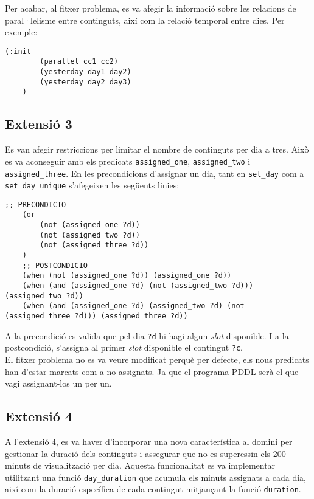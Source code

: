 \documentclass[a4paper]{article}
\begin{document}
	Per acabar, al fitxer problema, es va afegir la informació sobre les relacions de paral·lelisme entre continguts, així com la relació temporal entre dies. Per exemple:
	\begin{lstlisting}[language=PDDL, caption={Inicialització de paral·lels i dies consecutius}, label={lst:iniExtensio2}]
	(:init
		(parallel cc1 cc2)
		(yesterday day1 day2)
		(yesterday day2 day3)
	)
	\end{lstlisting}
	

	
	\subsection{Extensió 3}
	Es van afegir restriccions per limitar el nombre de continguts per dia a tres. Això es va aconseguir amb els predicats \texttt{assigned\_one}, \texttt{assigned\_two} i \texttt{assigned\_three}. En les precondicions d'assignar un dia, tant en \texttt{set\_day} com a \texttt{set\_day\_unique} s'afegeixen les següents linies: \\
	
	\begin{lstlisting}[language=PDDL, caption={Fragment per limitar a 3 els continguts per dia}, label={lst:extensio3}]
	;; PRECONDICIO	
	(or 
		(not (assigned_one ?d))
		(not (assigned_two ?d))
		(not (assigned_three ?d))
	)
	;; POSTCONDICIO
	(when (not (assigned_one ?d)) (assigned_one ?d))
	(when (and (assigned_one ?d) (not (assigned_two ?d))) (assigned_two ?d))
	(when (and (assigned_one ?d) (assigned_two ?d) (not (assigned_three ?d))) (assigned_three ?d))
	\end{lstlisting}
	
	A la precondició es valida que pel dia \texttt{?d} hi hagi algun \textit{slot} disponible. I a la postcondició, s'assigna al primer \textit{slot} disponible el contingut \texttt{?c}. \\
	
	El fitxer problema no es va veure modificat perquè per defecte, els nous predicats han d'estar marcats com a no-assignats. Ja que el programa PDDL serà el que vagi assignant-los un per un.

	\subsection{Extensió 4}
	
	A l'extensió 4, es va haver d'incorporar una nova característica al domini per gestionar la duració dels continguts i assegurar que no es superessin els 200 minuts de visualització per dia. Aquesta funcionalitat es va implementar utilitzant una funció \texttt{day\_duration} que acumula els minuts assignats a cada dia, així com la duració específica de cada contingut mitjançant la funció \texttt{duration}.
	
\end{document}
